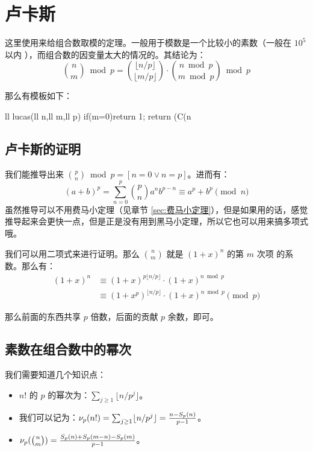 \section{卢卡斯} \label{sec:卢卡斯}
这里使用来给组合数取模的定理。一般用于模数是一个比较小的素数（一般在 $10^5$ 以内
），而组合数的因变量太大的情况的。其结论为：\[ {n \choose m} \bmod p = {\lfloor
        n / p \rfloor \choose \lfloor m / p \rfloor} \cdot {n \bmod p \choose m
\bmod p} \bmod p \]

那么有模板如下：
\begin{Cpp}
ll lucas(ll n,ll m,ll p){
  if(m=0)return 1;
  return (C(n%
}
\end{Cpp}


\subsection{卢卡斯的证明}
我们能推导出来 ${p \choose n} \bmod p = [n = 0 \lor n = p]$。进而有：\[
    (a + b)^p = \sum^{p}_{n = 0} {p \choose n} a^n b^{p - n} \equiv a^p + b^p
    \pmod n
\]
虽然推导可以不用费马小定理（见章节 \ref{sec:费马小定理}），但是如果用的话，感觉
推导起来会更快一点，但是正是没有用到黑马小定理，所以它也可以用来搞多项式哦。

我们可以用二项式来进行证明。那么 ${n \choose m}$ 就是 $(1 + x)^n$ 的第 $m$ 次项
的系数。那么有：\begin{align*}
    (1 + x)^n & \equiv (1 + x)^{p\lfloor n / p \rfloor} \cdot (1 + x)^{n \bmod p} \\
              & \equiv (1 + x^p)^{\lfloor n / p \rfloor} \cdot (1 + x)^{n \bmod p}
              \pmod p
\end{align*}

那么前面的东西共享 $p$ 倍数，后面的贡献 $p$ 余数，即可。


\subsection{素数在组合数中的幂次}
我们需要知道几个知识点：
\begin{itemize}
    \item $n!$ 的 $p$ 的幂次为：$\sum_{j \ge 1} \lfloor n / p^j \rfloor$。
    \item 我们可以记为：$\nu_p(n!) = \sum_{j \ge 1} \lfloor n / p^j \rfloor = {n
        - S_p(n) \over p - 1}$。
    \item $\nu_p({n \choose m}) = {S_p(n) + S_p(m - n) - S_p(m) \over p - 1}$。
\end{itemize}

